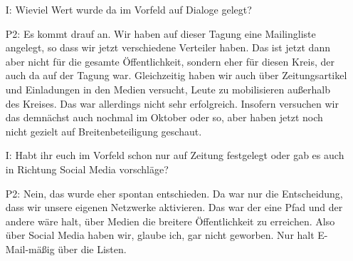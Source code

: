 \begin{itemize}
    \item[I:] Wieviel Wert wurde da im Vorfeld auf Dialoge gelegt?
    \item[P2:] Es kommt drauf an. Wir haben auf dieser Tagung eine Mailingliste angelegt, so dass wir jetzt verschiedene Verteiler haben. Das ist jetzt dann aber nicht f{\"u}r die gesamte {\"O}ffentlichkeit, sondern eher f{\"u}r diesen Kreis, der auch da auf der Tagung war. Gleichzeitig haben wir auch {\"u}ber Zeitungsartikel und Einladungen in den Medien versucht, Leute zu mobilisieren au{\ss}erhalb des Kreises. Das war allerdings nicht sehr erfolgreich. Insofern versuchen wir das demn{\"a}chst auch nochmal im Oktober oder so, aber haben jetzt noch nicht gezielt auf Breitenbeteiligung geschaut.
    \item[I:] Habt ihr euch im Vorfeld schon nur auf Zeitung festgelegt oder gab es auch in Richtung Social Media vorschl{\"a}ge?
    \item[P2:] Nein, das wurde eher spontan entschieden. Da war nur die Entscheidung, dass wir unsere eigenen Netzwerke aktivieren. Das war der eine Pfad und der andere w{\"a}re halt, {\"u}ber Medien die breitere {\"O}ffentlichkeit zu erreichen. Also {\"u}ber Social Media haben wir, glaube ich, gar nicht geworben. Nur halt E-Mail-m{\"a}{\ss}ig {\"u}ber die Listen.
\end{itemize}

